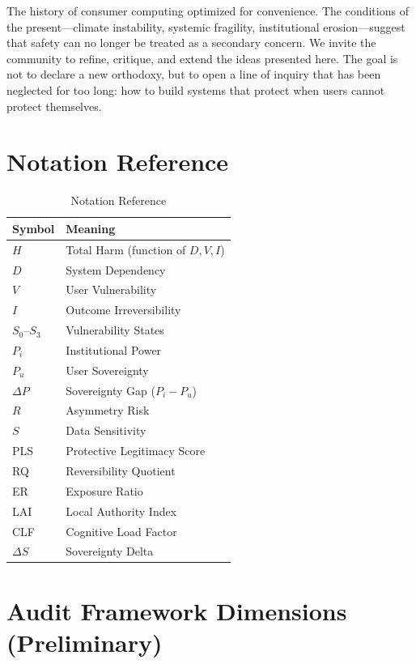 \documentclass[acmsmall,review]{acmart}
\begin{document}
The history of consumer computing optimized for convenience. The conditions of the present---climate instability, systemic fragility, institutional erosion---suggest that safety can no longer be treated as a secondary concern. We invite the community to refine, critique, and extend the ideas presented here. The goal is not to declare a new orthodoxy, but to open a line of inquiry that has been neglected for too long: how to build systems that protect when users cannot protect themselves.





\appendix

\section{Notation Reference}

\begin{table}[h]
\centering
\caption{Notation Reference}
\label{tab:notation}
\begin{tabular}{ll}
\toprule
\textbf{Symbol} & \textbf{Meaning} \\
\midrule
$H$ & Total Harm (function of $D, V, I$) \\
$D$ & System Dependency \\
$V$ & User Vulnerability \\
$I$ & Outcome Irreversibility \\
$S_0$--$S_3$ & Vulnerability States \\
$P_i$ & Institutional Power \\
$P_u$ & User Sovereignty \\
$\Delta P$ & Sovereignty Gap ($P_i - P_u$) \\
$R$ & Asymmetry Risk \\
$S$ & Data Sensitivity \\
PLS & Protective Legitimacy Score \\
RQ & Reversibility Quotient \\
ER & Exposure Ratio \\
LAI & Local Authority Index \\
CLF & Cognitive Load Factor \\
$\Delta S$ & Sovereignty Delta \\
\bottomrule
\end{tabular}
\end{table}

\section{Audit Framework Dimensions (Preliminary)}
\end{document}
